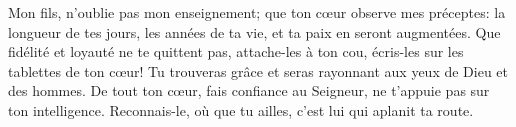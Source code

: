 Mon fils, n’oublie pas mon enseignement; que ton cœur observe mes préceptes:
	la longueur de tes jours, les années de ta vie,
		et ta paix en seront augmentées.
Que fidélité et loyauté ne te quittent pas,
	attache-les à ton cou, écris-les sur les tablettes de ton cœur!
	Tu trouveras grâce et seras rayonnant aux yeux de Dieu et des hommes.
De tout ton cœur, fais confiance au Seigneur,
	ne t’appuie pas sur ton intelligence.
	Reconnais-le, où que tu ailles, c’est lui qui aplanit ta route.
